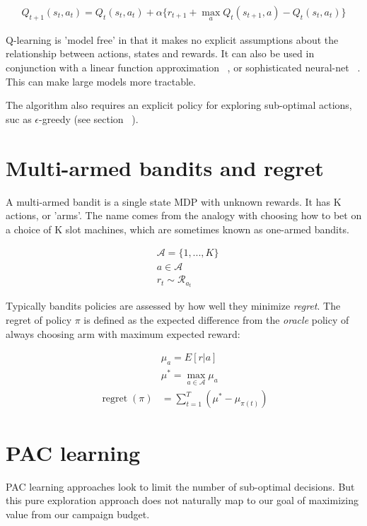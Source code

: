 \documentclass[11pt,a4,singlespacing,titlepagenumber=on]{scrreprt}
\numberwithin{equation}{chapter} %
\theoremstyle{remark}
\begin{document}
\begin{align}
Q_{t+1}(s_t,a_t) = Q_t(s_t,a_t) + \alpha\{r_{t+1} + \max_a Q_t(s_{t+1},a) -Q_t(s_t,a_t)\}
\end{align}

Q-learning is 'model free' in that it makes no explicit assumptions about the relationship between actions, states and rewards. It can also be used in conjunction with a linear function approximation ~\cite{tsitsiklis1997analysis}, or sophisticated neural-net ~\cite{mnih2013playing}. This can make large models more tractable.

The algorithm also requires an explicit policy for exploring sub-optimal actions, suc as $\epsilon$-greedy (see section ~).

\section{ Multi-armed bandits and regret}

A multi-armed bandit is a single state MDP with unknown rewards. It has K actions, or 'arms'. The name comes from the analogy with choosing how to bet on a choice of K slot machines, which are sometimes known as one-armed bandits.

\begin{align}
&\mathcal{A} = \{1,...,K\} \\
&a \in \mathcal{A} \\
&r_t \sim \mathcal{R}_{a_t} 
\end{align}

Typically bandits policies are assessed by how well they minimize \textit{regret}. The regret of policy $\pi$ is defined as the expected difference from the \textit{oracle} policy of always choosing arm with maximum expected reward:

\begin{align}
&\mu_a = E[r|a] \\
&\mu^{*} = \max_{a \in \mathcal{A}} \mu_a \\
\operatorname{regret}(\pi) &= \sum_{t=1}^T (\mu^{*} - \mu_{\pi(t)})
\end{align}

\section{PAC learning}

PAC learning approaches look to limit the number of sub-optimal decisions. But this pure exploration approach does not naturally map to our goal of maximizing value from our campaign budget.
\end{document}

